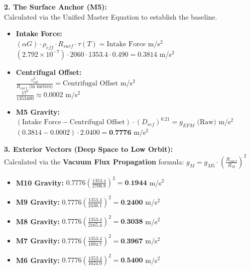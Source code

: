 \documentclass[11pt, a4paper]{article}
\begin{document}
  \vspace{1.0em}
  \noindent \textbf{2. The Surface Anchor (M5):} \\
  \hspace*{1em} Calculated via the Unified Master Equation to establish the baseline.
  \begin{itemize}
    \item \textbf{Intake Force:} \\[0.5em]
    \hspace*{2em} $(\alpha G) \cdot \rho_{eff} \cdot R_{surf} \cdot \tau(T) = \text{Intake Force}$ m/s$^2$ \\[1em]
    \hspace*{2em} $(2.792 \times 10^{-7}) \cdot 2060 \cdot 1353.4 \cdot 0.490 = 0.3814$ m/s$^2$
    
    \item \textbf{Centrifugal Offset:} \\[0.5em]
    \hspace*{2em} $\frac{v_{rot}^2}{R_{surf} \text{ (in meters)}} = \text{Centrifugal Offset}$ m/s$^2$ \\[1em]
    \hspace*{2em} $\frac{17^2}{1353400} \approx 0.0002$ m/s$^2$
    
    \item \textbf{M5 Gravity:} \\[0.5em]
    \hspace*{2em} $(\text{Intake Force} - \text{Centrifugal Offset}) \cdot (D_{ref})^{0.21} = g_{EFM} \text{ (Raw)}$ m/s$^2$ \\[1em]
    \hspace*{2em} $(0.3814 - 0.0002) \cdot 2.0400 = \textbf{0.7776}$ m/s$^2$
  \end{itemize}

  \clearpage
  \noindent \textbf{3. Exterior Vectors (Deep Space to Low Orbit):} \\
  \hspace*{1em} Calculated via the \textbf{Vacuum Flux Propagation} formula: $g_M = g_{M5} \cdot \left( \frac{R_{surf}}{R_M} \right)^2$
  \begin{itemize}
    \item \textbf{M10 Gravity:} $0.7776 \left( \frac{1353.4}{2706.8} \right)^2 = \textbf{0.1944}$ m/s$^2$
    \item \textbf{M9 Gravity:} $0.7776 \left( \frac{1353.4}{2436.1} \right)^2 = \textbf{0.2400}$ m/s$^2$
    \item \textbf{M8 Gravity:} $0.7776 \left( \frac{1353.4}{2165.4} \right)^2 = \textbf{0.3038}$ m/s$^2$
    \item \textbf{M7 Gravity:} $0.7776 \left( \frac{1353.4}{1894.7} \right)^2 = \textbf{0.3967}$ m/s$^2$
    \item \textbf{M6 Gravity:} $0.7776 \left( \frac{1353.4}{1624.0} \right)^2 = \textbf{0.5400}$ m/s$^2$
  \end{itemize}
\end{document}
